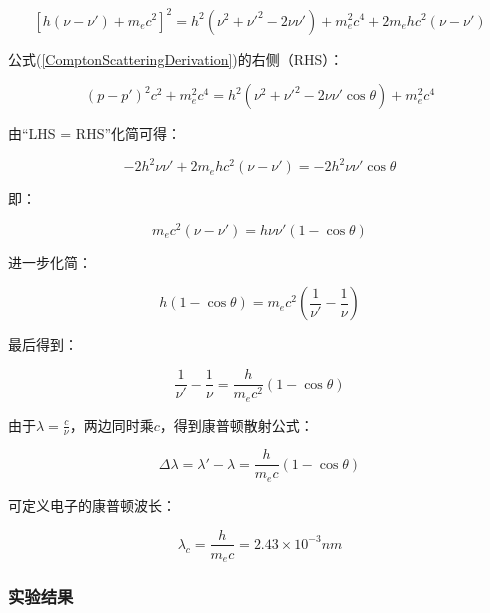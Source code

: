 \begin{equation*}
\left[ {h(\nu  - \nu ') + m_e c^2 } \right]^2  = h^2 (\nu ^2  + \nu '^2  - 2\nu \nu ') + m_e ^2 c^4  + 2m_e hc^2 (\nu  - \nu ')
\end{equation*}

公式(\ref{ComptonScatteringDerivation})的右侧（RHS）：

\begin{equation*}
(p - p')^2 c^2  + m_e ^2 c^4  = h^2 (\nu ^2  + \nu '^2  - 2\nu \nu '\cos \theta ) + m_e ^2 c^4 
\end{equation*}

由“LHS = RHS”化简可得：

\begin{equation*}
 - 2h^2 \nu \nu ' + 2m_e hc^2 (\nu  - \nu ') =  - 2h^2 \nu \nu '\cos \theta
\end{equation*}

即：

\begin{equation*}
m_e c^2 (\nu  - \nu ') = h\nu \nu '(1 - \cos \theta )
\end{equation*}

进一步化简：

\begin{equation*}
h(1 - \cos \theta ) = m{}_ec^2 \left( {\frac{1}{{\nu '}} - \frac{1}{\nu }} \right)
\end{equation*}

最后得到：

\begin{equation*}
\frac{1}{{\nu '}} - \frac{1}{\nu } = \frac{h}{{m_e c^2 }}(1 - \cos \theta )
\end{equation*}

由于$\lambda  = \frac{c}{\nu }$，两边同时乘$c$，得到康普顿散射公式：

\begin{equation}\label{Compton's formula}
    \Delta \lambda  = \lambda ' - \lambda  = \frac{h}{{m_e c}}(1 - \cos \theta )
\end{equation}



可定义电子的康普顿波长：

\begin{equation}
\lambda _c  = \frac{h}{{m_e c}} = 2.43 \times 10^{ - 3} nm
\end{equation}

\subsubsection{实验结果}


